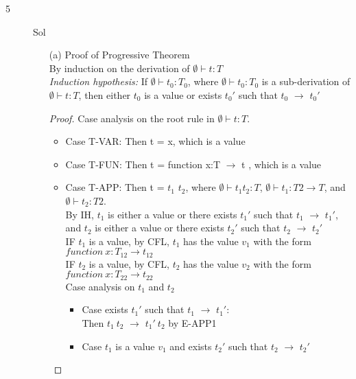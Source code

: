 \documentclass{article}
\begin{document}
\begin{description}
        \item [5]{Sol}
            \begin{enumerate}
                \item[(a)]{Proof of Progressive Theorem} \\
                    By induction on the derivation of $\emptyset \vdash t:T$\\
                    \textit{Induction hypothesis:} If $\emptyset \vdash t_0:T_0$, where $\emptyset \vdash t_0:T_0$ is a sub-derivation of $\emptyset \vdash t:T$, then either $t_0$ is a value or exists $t_0'$ such that  $t_0$ $\rightarrow$ $t_0'$
                    \begin{proof}
                        Case analysis on the root rule in $\emptyset \vdash t:T$.
                        \begin{itemize}
                            \item Case T-VAR: Then t = x, which is a value
                            \item Case T-FUN: Then t = function x:T $\rightarrow$ t , which is a value
                            \item Case T-APP: Then t = $t_1$ $t_2$, where $\emptyset \vdash t_1 t_2 :T$, $\emptyset \vdash t_1:T2 \rightarrow T $, and $\emptyset \vdash t_2:T2$. \\
                                By IH, $t_1$ is either a value or there exists $t_1'$ such that $t_1$ $\rightarrow$ $t_1'$, and $t_2$ is either a value or there exists $t_2'$ such that $t_2$ $\rightarrow$ $t_2'$\\
                                IF $t_1$ is a value, by CFL, $t_1$ has the value $v_1$ with the form $function\ x:T_{12} \rightarrow t_{12}$\\
                                IF $t_2$ is a value, by CFL, $t_2$ has the value $v_2$ with the form $function\ x:T_{22} \rightarrow t_{22}$\\
                                Case analysis on $t_1$ and $t_2$
                                \begin{itemize}
                                    \item Case exists $t_1'$ such that $t_1$ $\rightarrow$ $t_1'$:\\
                                        Then $t_1\ t_2$ $\rightarrow$ $t_1'\ t_2$ by E-APP1
                                    \item Case $t_1$ is a value $v_1$ and exists $t_2'$ such that $t_2$ $\rightarrow$ $t_2'$\\

\end{itemize}
\end{itemize}
\end{proof}
\end{enumerate}
\end{description}
\end{document}
